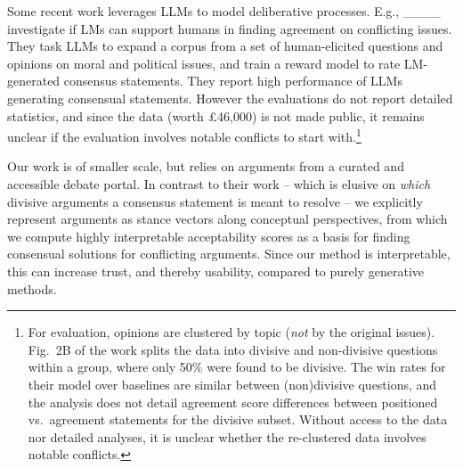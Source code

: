 Some recent work leverages LLMs to model deliberative processes. E.g., ____ investigate if LMs can support humans in finding agreement on conflicting issues. They task LLMs to expand a corpus from a set of human-elicited questions and opinions on moral and political issues, 
and train a reward model to rate LM-generated consensus statements. 
They report high performance of LLMs generating consensual statements. However the evaluations do not report detailed statistics, and since the data
(worth £46,000) is not made public, it remains unclear if the evaluation involves notable conflicts to start with.\footnote{For evaluation,  opinions are clustered by topic (\textit{not} by the original issues). 
Fig.\ 2B of the work splits the data into divisive and non-divisive questions within a group, where only 50\% were found to be divisive. The win rates for their model over baselines are similar between (non)divisive  questions, and the analysis does not detail agreement score differences between positioned vs.\ agreement statements for the divisive subset. Without access to the data nor detailed analyses, it is unclear whether the re-clustered data involves notable conflicts.}


Our work is of smaller scale, but relies on arguments from a curated and accessible debate portal. 
In contrast to their work -- which is elusive on %
\textit{which} divisive arguments a consensus statement is meant to resolve --
we explicitly represent arguments as stance vectors along conceptual perspectives, from which we compute highly interpretable acceptability scores as a basis for finding consensual solutions for conflicting arguments. Since our method is interpretable, this can 
increase trust, and thereby usability, compared to purely generative methods.